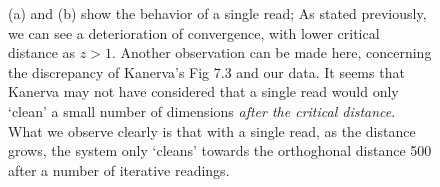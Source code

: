 
\begin{figure}[h!]
  \centering


  \caption{(a) and (b) show the behavior of a single read; As stated previously, we can see a deterioration of convergence, with lower critical distance as $z>1$.  Another observation can be made here, concerning the discrepancy of Kanerva's Fig 7.3 and our data.  It seems that Kanerva may not have considered that a single read would only `clean' a small number of dimensions \emph{after the critical distance}. What we observe clearly is that with a single read, as the distance grows, the system only `cleans' towards the orthoghonal distance 500 after a number of iterative readings.}
  \label{fig:murillo-generalization-experiments}
\end{figure}

